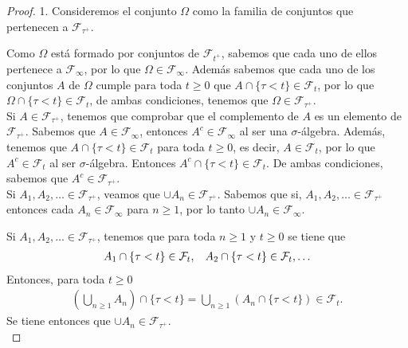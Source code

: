 \begin{proof}
1. Consideremos el conjunto $\Omega$ como la familia de conjuntos que pertenecen a $\mathcal{F}_{\tau^{+}}$. 


Como $\Omega$ está formado por conjuntos de $\mathcal{F}_{t^{+}}$, sabemos que cada uno de ellos pertenece a $\mathcal{F}_{\infty}$, por lo que $\Omega \in \mathcal{F}_{\infty}$. Además sabemos que cada uno de los conjuntos $A$ de $\Omega$ cumple para toda $t \geq 0$ que $A \cap \{\tau < t\} \in \mathcal{F}_t$, por lo que $\Omega \cap \{\tau < t\} \in \mathcal{F}_t$, de ambas condiciones, tenemos que $\Omega \in \mathcal{F}_{\tau^{+}}$. \\

Si $A \in \mathcal{F}_{\tau^{+}}$, tenemos que comprobar que el complemento de $A$ es un elemento de $\mathcal{F}_{\tau^{+}}$. Sabemos que $A \in \mathcal{F}_{\infty}$, entonces $A^{c} \in \mathcal{F}_{\infty}$ al ser una $\sigma$-álgebra. Además, tenemos que $A \cap \{ \tau < t \} \in \mathcal{F}_t$ para toda $t \geq 0$, es decir, $A \in \mathcal{F}_t$, por lo que $A^{c} \in \mathcal{F}_t$ al ser $\sigma$-álgebra. Entonces $A^{c} \cap \{\tau < t\} \in \mathcal{F}_t$. De ambas condiciones, sabemos que $A^{c} \in \mathcal{F}_{\tau^{+}}$. \\

Si $A_1, A_2, \ldots \in \mathcal{F}_{\tau^{+}}$, veamos que $\cup A_n \in \mathcal{F}_{\tau^{+}}$. Sabemos que si, $A_1, A_2, \ldots \in \mathcal{F}_{\tau^{+}}$ entonces cada $A_n \in \mathcal{F}_{\infty}$ para $n \geq 1$, por lo tanto $\cup A_n \in \mathcal{F}_{\infty}$.

Si $A_1, A_2, \ldots \in \mathcal{F}_{\tau^{+}}$, tenemos que para toda $n \geq 1$ y $t \geq 0$ se tiene que 
\begin{align*}
	A_1 \cap \{\tau < t\} \in \mathcal{F}_t, \hspace{0.3cm} A_2 \cap \{\tau < t\} \in \mathcal{F}_t, \ldots
\end{align*}
Entonces, para toda $t \geq 0$
\begin{align*}
	\left( \bigcup_{n \geq 1} A_n \right) \cap \{\tau < t\} = \bigcup_{n \geq 1} \left( A_n \cap \{\tau < t\} \right) \in \mathcal{F}_t.
\end{align*}
Se tiene entonces que $\cup A_n \in \mathcal{F}_{\tau^{+}}$. \\


\end{proof}
